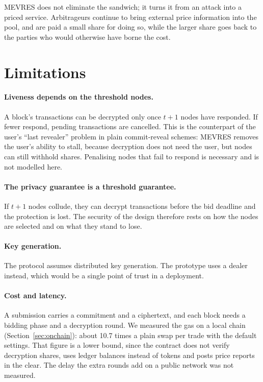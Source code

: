 MEVRES does not eliminate the sandwich; it turns it from an attack into a priced service. Arbitrageurs continue to bring external price information into the pool, and are paid a small share for doing so, while the larger share goes back to the parties who would otherwise have borne the cost.

\section{Limitations}

\paragraph{Liveness depends on the threshold nodes.} A block's transactions can be decrypted only once $t+1$ nodes have responded. If fewer respond, pending transactions are cancelled. This is the counterpart of the user's ``last revealer'' problem in plain commit-reveal schemes: MEVRES removes the user's ability to stall, because decryption does not need the user, but nodes can still withhold shares. Penalising nodes that fail to respond is necessary and is not modelled here.

\paragraph{The privacy guarantee is a threshold guarantee.} If $t+1$ nodes collude, they can decrypt transactions before the bid deadline and the protection is lost. The security of the design therefore rests on how the nodes are selected and on what they stand to lose.

\paragraph{Key generation.} The protocol assumes distributed key generation. The prototype uses a dealer instead, which would be a single point of trust in a deployment.

\paragraph{Cost and latency.} A submission carries a commitment and a ciphertext, and each block needs a bidding phase and a decryption round. We measured the gas on a local chain (Section~\ref{sec:onchain}): about 10.7 times a plain swap per trade with the default settings. That figure is a lower bound, since the contract does not verify decryption shares, uses ledger balances instead of tokens and posts price reports in the clear. The delay the extra rounds add on a public network was not measured.

